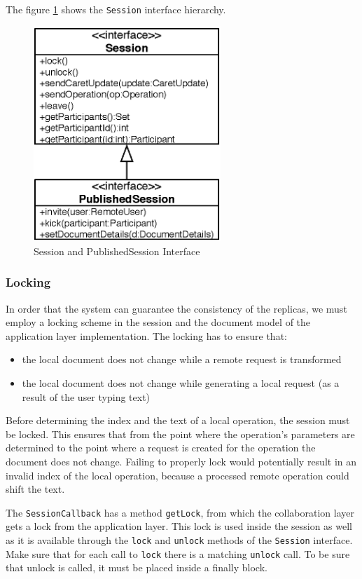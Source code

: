 The figure \ref{fig:archoverview.session} shows the \texttt{Session} interface
hierarchy.

\begin{figure}[H]
 \centering
 \includegraphics[width=7.06cm,height=8.11cm]{../images/finalreport/architecture_session_uml.eps}
 \caption{Session and PublishedSession Interface}
 \label{fig:archoverview.session}
\end{figure}


\subsubsection{Locking}
In order that the system can guarantee the consistency of the replicas, we
must employ a locking scheme in the session and the document model of
the application layer implementation. The locking has to ensure that:

\begin{itemize}
 \item the local document does not change while a remote request is 
transformed
 \item the local document does not change while generating a local request (as a result of the user typing text)
\end{itemize}

Before determining the index and the text of a local operation, the session must
be locked. This ensures that from the point where the operation's parameters
are determined
to the point where a request is created for the operation the document does
not change. Failing to properly lock would potentially result in an invalid index of the local operation, because a processed remote operation could 
shift the text.

The \texttt{Session\-Callback} has a method \texttt{get\-Lock}, from which
the collaboration layer gets a lock from the application layer. This
lock is used inside the session as well as it is available through the
\texttt{lock} and \texttt{unlock} methods of the \texttt{Session} interface.
Make sure that for each call to
\texttt{lock} there is a matching \texttt{unlock} call. To be sure that unlock
is called, it must be placed inside a finally block.

